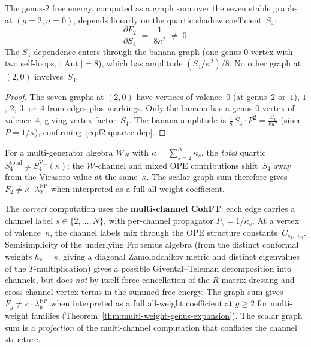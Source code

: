 \begin{proposition}%
\label{prop:f2-quartic-dependence}%
%
The genus-$2$ free energy, computed as a graph sum over the seven
stable graphs at $(g{=}2, n{=}0)$, depends linearly on the
quartic shadow coefficient~$S_4$:
\begin{equation}\label{eq:f2-quartic-dep}
 \frac{\partial F_2}{\partial S_4} \;=\; \frac{1}{8\kappa^2} \;\neq\; 0.
\end{equation}
The $S_4$-dependence enters through the banana graph
\textup{(}one genus-$0$ vertex with two self-loops, $|\operatorname{Aut}| = 8$\textup{)},
which has amplitude $(S_4 / \kappa^2) / 8$.
No other graph at $(2,0)$ involves~$S_4$.
\end{proposition}

\begin{proof}
The seven graphs at $(2, 0)$ have vertices of valence~$0$
(at genus~$2$ or~$1$), $1$, $2$, $3$, or~$4$ from edges plus
markings. Only the banana has a genus-$0$ vertex of
valence~$4$, giving vertex factor~$S_4$.
The banana amplitude is
$\frac{1}{8}\,S_4 \cdot P^2 = \frac{S_4}{8\kappa^2}$
(since $P = 1/\kappa$),
confirming~\eqref{eq:f2-quartic-dep}.
\end{proof}

\begin{remark}%
\label{rem:multichannel-resolution}%
%
For a multi-generator algebra $\mathcal{W}_N$ with
$\kappa = \sum_{s=2}^N \kappa_s$, the \emph{total} quartic
$S_4^{\mathrm{total}} \neq S_4^{\mathrm{Vir}}(\kappa)$:
the $\mathcal{W}$-channel and mixed OPE contributions shift~$S_4$
away from the Virasoro value at the same~$\kappa$.
The scalar graph sum therefore gives
$F_2 \neq \kappa \cdot \lambda_2^{\mathrm{FP}}$
when interpreted as a full all-weight coefficient.

The \emph{correct} computation uses the \textbf{multi-channel CohFT}:
each edge carries a channel label $s \in \{2, \ldots, N\}$,
with per-channel propagator $P_s = 1/\kappa_s$.
At a vertex of valence~$n$, the channel labels mix through the
OPE structure constants~$C_{s_1\ldots s_n}$.
Semisimplicity of the underlying Frobenius algebra
(from the distinct conformal weights $h_s = s$, giving a
diagonal Zamolodchikov metric and distinct eigenvalues of
the $T$-multiplication) gives a possible Givental--Teleman
decomposition into channels, but does \emph{not} by itself
force cancellation of the $R$-matrix dressing and cross-channel
vertex terms in the summed free energy.
The graph sum gives
$F_g \neq \kappa \cdot \lambda_g^{\mathrm{FP}}$
when interpreted as a full all-weight coefficient at $g \ge 2$
for multi-weight families
(Theorem~\ref{thm:multi-weight-genus-expansion}).
The scalar graph sum is a \emph{projection} of the
multi-channel computation that conflates the channel structure.
\end{remark}

